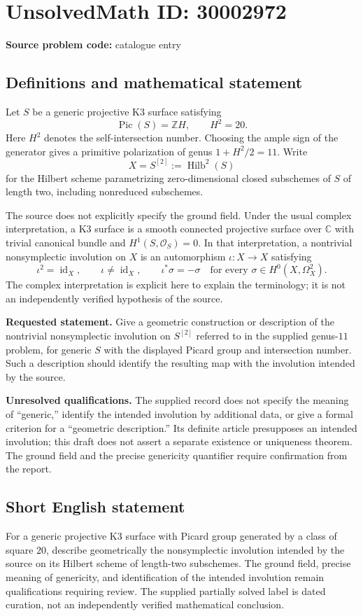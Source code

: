 \documentclass[11pt]{article}
\newcommand{\C}{\mathbb{C}}
\begin{document}
\section*{UnsolvedMath ID: 30002972}
\textbf{Source problem code:} catalogue entry
\subsection{Definitions and mathematical statement}
Let \(S\) be a generic projective K3 surface satisfying
\[
\operatorname{Pic}(S)=\mathbb ZH,\qquad H^2=20.
\]
Here \(H^2\) denotes the self-intersection number. Choosing the ample sign of the generator gives a primitive polarization of genus \(1+H^2/2=11\). Write
\[
X=S^{[2]}:=\operatorname{Hilb}^{2}(S)
\]
for the Hilbert scheme parametrizing zero-dimensional closed subschemes of \(S\) of length two, including nonreduced subschemes.

The source does not explicitly specify the ground field. Under the usual complex interpretation, a K3 surface is a smooth connected projective surface over \(\C\) with trivial canonical bundle and \(H^1(S,\mathcal O_S)=0\). In that interpretation, a nontrivial nonsymplectic involution on \(X\) is an automorphism \(\iota\colon X\to X\) satisfying
\[
\iota^2=\operatorname{id}_X,\qquad \iota\ne\operatorname{id}_X,\qquad
\iota^*\sigma=-\sigma
\quad\text{for every }\sigma\in H^0(X,\Omega_X^2).
\]
The complex interpretation is explicit here to explain the terminology; it is not an independently verified hypothesis of the source.

\textbf{Requested statement.} Give a geometric construction or description of the nontrivial nonsymplectic involution on \(S^{[2]}\) referred to in the supplied genus-\(11\) problem, for generic \(S\) with the displayed Picard group and intersection number. Such a description should identify the resulting map with the involution intended by the source.

\textbf{Unresolved qualifications.} The supplied record does not specify the meaning of ``generic,'' identify the intended involution by additional data, or give a formal criterion for a ``geometric description.'' Its definite article presupposes an intended involution; this draft does not assert a separate existence or uniqueness theorem. The ground field and the precise genericity quantifier require confirmation from the report.
\subsection{Short English statement}
For a generic projective K3 surface with Picard group generated by a class of square \(20\), describe geometrically the nonsymplectic involution intended by the source on its Hilbert scheme of length-two subschemes. The ground field, precise meaning of genericity, and identification of the intended involution remain qualifications requiring review. The supplied partially solved label is dated curation, not an independently verified mathematical conclusion.
\end{document}
